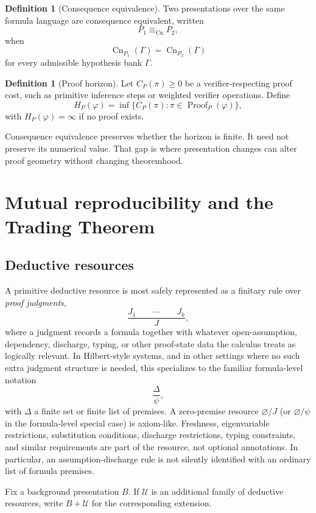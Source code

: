 \documentclass[11pt]{article}
\theoremstyle{definition}
\newtheorem{definition}[theorem]{Definition}
\theoremstyle{remark}
\newcommand{\Cn}{\operatorname{Cn}}
\newcommand{\Proof}{\operatorname{Proof}}
\newcommand{\equivCn}{\equiv_{\mathrm{Cn}}}
\begin{document}
\begin{definition}[Consequence equivalence]
Two presentations over the same formula language are consequence equivalent, written
\[
P_1\equivCn P_2,
\]
when
\[
\Cn_{P_1}(\Gamma)=\Cn_{P_2}(\Gamma)
\]
for every admissible hypothesis bank $\Gamma$.
\end{definition}

\begin{definition}[Proof horizon]
Let $C_P(\pi)\ge 0$ be a verifier-respecting proof cost, such as primitive inference steps or weighted verifier operations. Define
\[
H_P(\varphi)=\inf\{C_P(\pi):\pi\in\Proof_P(\varphi)\},
\]
with $H_P(\varphi)=\infty$ if no proof exists.
\end{definition}

Consequence equivalence preserves whether the horizon is finite. It need not preserve its numerical value. That gap is where presentation changes can alter proof geometry without changing theoremhood.

\section{Mutual reproducibility and the Trading Theorem}

\subsection{Deductive resources}
A primitive deductive resource is most safely represented as a finitary rule over \emph{proof judgments},
\[
\frac{J_1\qquad\cdots\qquad J_k}{J},
\]
where a judgment records a formula together with whatever open-assumption, dependency, discharge, typing, or other proof-state data the calculus treats as logically relevant. In Hilbert-style systems, and in other settings where no such extra judgment structure is needed, this specializes to the familiar formula-level notation
\[
\frac{\Delta}{\psi},
\]
with $\Delta$ a finite set or finite list of premises. A zero-premise resource $\varnothing/J$ (or $\varnothing/\psi$ in the formula-level special case) is axiom-like. Freshness, eigenvariable restrictions, substitution conditions, discharge restrictions, typing constraints, and similar requirements are part of the resource, not optional annotations. In particular, an assumption-discharge rule is not silently identified with an ordinary list of formula premises.

Fix a background presentation $B$. If $\mathcal U$ is an additional family of deductive resources, write $B+\mathcal U$ for the corresponding extension.
\end{document}

